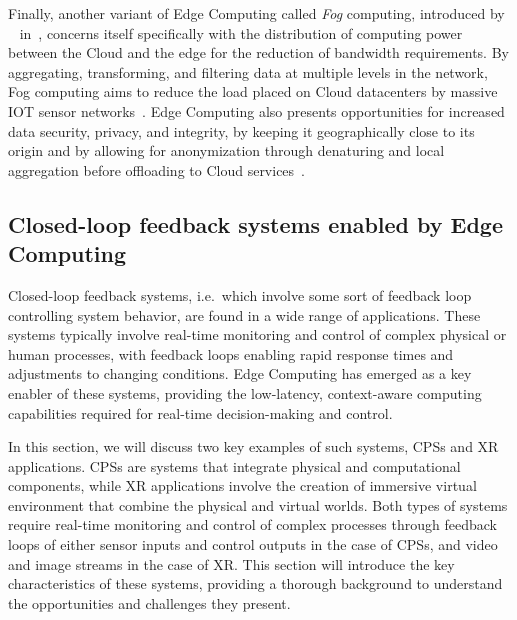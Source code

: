 Finally, another variant of Edge Computing called \emph{Fog} computing, introduced by \citeauthor{bonomi2012fog}~\cite{bonomi2012fog} in\ \citeyear{bonomi2012fog}, concerns itself specifically with the distribution of computing power between the Cloud and the edge for the reduction of bandwidth requirements.
By aggregating, transforming, and filtering data at multiple levels in the network, Fog computing aims to reduce the load placed on Cloud datacenters by massive \gls{IOT} sensor networks~\cite{yi2015survey}.
Edge Computing also presents opportunities for increased data security, privacy, and integrity, by keeping it geographically close to its origin and by allowing for anonymization through denaturing and local aggregation before offloading to Cloud services~\cite{satyanarayanan2017emergence}.

\subsection{Closed-loop feedback systems enabled by Edge Computing}

Closed-loop feedback systems, i.e.\ which involve some sort of feedback loop controlling system behavior, are found in a wide range of applications.
These systems typically involve real-time monitoring and control of complex physical or human processes, with feedback loops enabling rapid response times and adjustments to changing conditions.
Edge Computing has emerged as a key enabler of these systems, providing the low-latency, context-aware computing capabilities required for real-time decision-making and control.

In this section, we will discuss two key examples of such systems, \glspl{CPS} and \gls{XR} applications.
\glspl{CPS} are systems that integrate physical and computational components, while \gls{XR} applications involve the creation of immersive virtual environment that combine the physical and virtual worlds.
Both types of systems require real-time monitoring and control of complex processes through feedback loops of either sensor inputs and control outputs in the case of \glspl{CPS}, and video and image streams in the case of \gls{XR}.
This section will introduce the key characteristics of these systems, providing a thorough background to understand the opportunities and challenges they present.

\subsubsection{}\label{background:xr}

